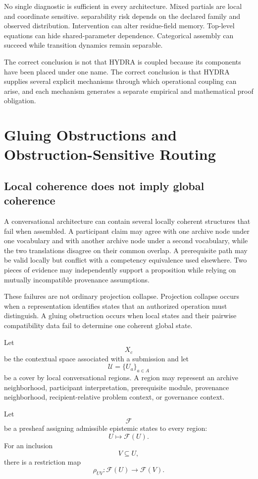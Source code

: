 \documentclass[11pt]{article}
\theoremstyle{definition}
\begin{document}
No single diagnostic is sufficient in every architecture. Mixed partials are local and coordinate sensitive. separability risk depends on the declared family and observed distribution. Intervention can alter residue-field memory. Top-level equations can hide shared-parameter dependence. Categorical assembly can succeed while transition dynamics remain separable.

The correct conclusion is not that HYDRA is coupled because its components have been placed under one name. The correct conclusion is that HYDRA supplies several explicit mechanisms through which operational coupling can arise, and each mechanism generates a separate empirical and mathematical proof obligation.

\section{Gluing Obstructions and Obstruction-Sensitive Routing}

\subsection{Local coherence does not imply global coherence}

A conversational architecture can contain several locally coherent structures that fail when assembled. A participant claim may agree with one archive node under one vocabulary and with another archive node under a second vocabulary, while the two translations disagree on their common overlap. A prerequisite path may be valid locally but conflict with a competency equivalence used elsewhere. Two pieces of evidence may independently support a proposition while relying on mutually incompatible provenance assumptions.

These failures are not ordinary projection collapse. Projection collapse occurs when a representation identifies states that an authorized operation must distinguish. A gluing obstruction occurs when local states and their pairwise compatibility data fail to determine one coherent global state.

Let
\[
X_c
\]
be the contextual space associated with a submission and let
\[
\mathcal U
=
\{U_a\}_{a\in A}
\]
be a cover by local conversational regions. A region may represent an archive neighborhood, participant interpretation, prerequisite module, provenance neighborhood, recipient-relative problem context, or governance context.

Let
\[
\mathscr F
\]
be a presheaf assigning admissible epistemic states to every region:
\[
U
\longmapsto
\mathscr F(U).
\]
For an inclusion
\[
V\subseteq U,
\]
there is a restriction map
\[
\rho_{UV}:
\mathscr F(U)\to\mathscr F(V).
\]
\end{document}
